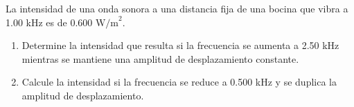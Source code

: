 \item La intensidad de una onda sonora a una distancia fija de una bocina que vibra a 1.00 kHz es de $0.600\text{ W/m}^2$.
\begin{enumerate}
    \item Determine la intensidad que resulta si la frecuencia se aumenta a 2.50 kHz mientras se mantiene una amplitud de desplazamiento constante.
    \item Calcule la intensidad si la frecuencia se reduce a 0.500 kHz y se duplica la amplitud de desplazamiento.
\end{enumerate}